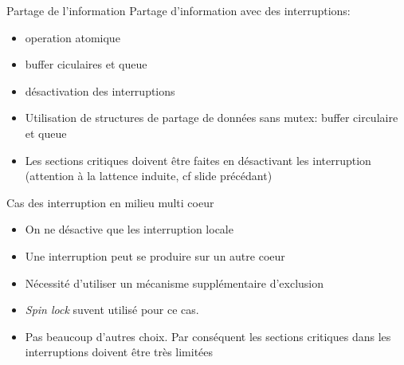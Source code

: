 
\begin{frame}{Partage de l'information}
  Partage d'information avec des interruptions:
  \begin{itemize} 
  \item  operation atomique
  \item  buffer ciculaires et queue
  \item  désactivation des interruptions
  \end{itemize} 
  \begin{itemize} 
  \item Utilisation  de structures de  partage de données  sans mutex:
    buffer circulaire et queue
  \item Les sections critiques  doivent être faites en désactivant les
    interruption (attention à la lattence induite, cf slide précédant)
  \end{itemize} 
\end{frame} 

\begin{frame}{Cas des interruption en milieu multi coeur}
  \begin{itemize} 
  \item On ne désactive que les interruption locale
  \item Une interruption peut se produire sur un autre coeur
  \item Nécessité d'utiliser un mécanisme supplémentaire d'exclusion
  \item \emph{Spin lock} suvent utilisé pour ce cas.
  \item  Pas beaucoup  d'autres  choix.  Par  conséquent les  sections
    critiques dans les interruptions doivent être très limitées
  \end{itemize} 
\end{frame} 

